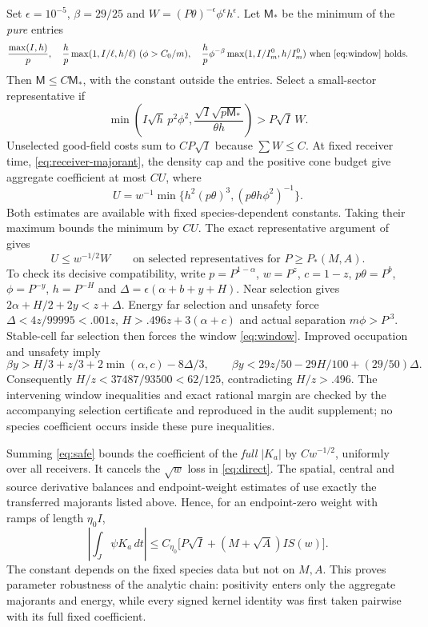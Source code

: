 \documentclass[11pt]{article}
\theoremstyle{remark}\newtheorem{remark}[theorem]{Remark}
\numberwithin{equation}{section}
\begin{document}
Set $\epsilon=10^{-5}$, $\beta=29/25$ and
$W=(P\theta)^{-\epsilon}\phi^\epsilon h^\epsilon$.
Let $\mathsf M_*$ be the minimum of the \emph{pure} entries
\[
 \frac{\max(I,h)}p,\quad
 \frac hp\max(1,I/\ell,h/\ell)\ (\phi>C_0/m),\quad
 \frac hp\phi^{-\beta}\max(1,I/I_m^0,h/I_m^0)\
       \text{when \eqref{eq:window} holds}.
\]
Then $\mathsf M\le C\mathsf M_*$, with the constant outside the entries.
Select a small-sector representative if
\begin{equation}\label{eq:selection}
 \min\left(I\sqrt h\,p^2\phi^2,
      \frac{\sqrt I\sqrt{p\mathsf M_*}}{\theta h}\right)>P\sqrt I\,W.
\end{equation}
Unselected good-field costs sum to $CP\sqrt I$ because $\sum W\le C$.
At fixed receiver time, \eqref{eq:receiver-majorant}, the density cap and
the positive cone budget give aggregate coefficient at most $CU$, where
\begin{equation}\label{eq:U}
 U=w^{-1}\min\{h^2(p\theta)^3,(p\theta h\phi^2)^{-1}\}.
\end{equation}
Both estimates are available with fixed species-dependent constants. Taking
their maximum bounds the minimum by $CU$. The exact representative
argument of \cite[Section 8]{OAI362} gives
\begin{equation}\label{eq:safe}
 U\le w^{-1/2}W\qquad\text{on selected representatives for }P\ge P_*(M,A).
\end{equation}
To check its decisive compatibility, write
$p=P^{1-\alpha}$, $w=P^z$, $c=1-z$, $p\theta=P^b$,
$\phi=P^{-y}$, $h=P^{-H}$ and
$\Delta=\epsilon(\alpha+b+y+H)$.
Near selection gives $2\alpha+H/2+2y<z+\Delta$.
Energy far selection and unsafety force
$\Delta<4z/99995<.001z$,
$H>.496z+3(\alpha+c)$ and actual separation $m\phi>P^{.3}$.
Stable-cell far selection then forces the window \eqref{eq:window}.
Improved occupation and unsafety imply
\[
 \beta y>H/3+z/3+2\min(\alpha,c)-8\Delta/3,
 \qquad\beta y<29z/50-29H/100+(29/50)\Delta.
\]
Consequently $H/z<37487/93500<62/125$, contradicting $H/z>.496$.
The intervening window inequalities and exact rational margin are checked
by the accompanying selection certificate and reproduced in the audit
supplement; no species coefficient occurs inside these pure inequalities.

Summing \eqref{eq:safe} bounds the coefficient of the \emph{full} $|K_a|$
by $Cw^{-1/2}$, uniformly over all receivers. It cancels the $\sqrt w$
loss in \eqref{eq:direct}. The spatial, central and source derivative
balances and endpoint-weight estimates of \cite[Section 8]{OAI362} use
exactly the transferred majorants listed above. Hence, for an endpoint-zero
weight with ramps of length $\eta_0 I$,
\begin{equation}\label{eq:weighted}
 \left|\int_J\psi K_a\,dt\right|
 \le C_{\eta_0}\bigl[P\sqrt I+(M+\sqrt A)IS(w)\bigr].
\end{equation}
The constant depends on the fixed species data but not on $M,A$.
This proves parameter robustness of the analytic chain: positivity enters
only the aggregate majorants and energy, while every signed kernel identity
was first taken pairwise with its full fixed coefficient.
\end{document}
